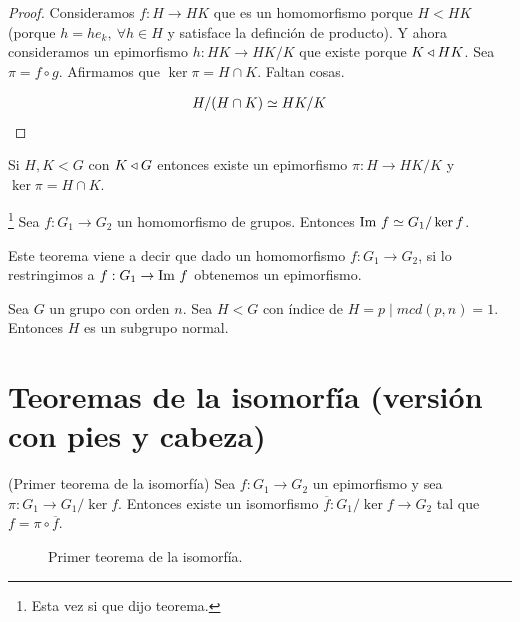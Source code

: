 


\begin{proof}
	Consideramos $f:H \to HK$ que es un homomorfismo porque $H < HK$ (porque $h = he_k,\ \forall h \in H$ y satisface la definción de producto). Y ahora consideramos un epimorfismo $h:HK \to HK/K$ que existe porque $K \mathbin{\triangleleft} HK$. Sea $\pi = f \circ g$. Afirmamos que $\ker \pi = H \cap K$. Faltan cosas.
	
	\begin{align*}
		H/(H\cap K) \simeq HK/K
	\end{align*}
\end{proof}

\begin{cor}
	Si $H,K < G$ con $K \mathbin{\triangleleft} G$ entonces existe un epimorfismo $\pi:H\to HK/K$ y $\ker \pi = H \cap K$.
\end{cor}

\begin{thm}\footnote{Esta vez si que dijo teorema.}
	Sea $f:G_1 \to G_2$ un homomorfismo de grupos. Entonces $\text{Im } f \simeq G_1 / \ker f$.
\end{thm}

Este teorema viene a decir que dado un homomorfismo $f:G_1 \to G_2$, si lo restringimos a $f:G_1 \to \text{Im } f$ obtenemos un epimorfismo.


\begin{pro}
	Sea $G$ un grupo con orden $n$. Sea $H < G$ con índice de $H = p \mid mcd(p,n) = 1$. Entonces $H$ es un subgrupo normal.
\end{pro}

\section{Teoremas de la isomorfía (versión con pies y cabeza)}

\begin{thm}(Primer teorema de la isomorfía)
	Sea $f:G_1 \to G_2$ un epimorfismo y sea $\pi:G_1 \to G_1/\ker f$. Entonces existe un isomorfismo $\overline{f} : G_1 / \ker f \to G_2$ tal que $f = \pi \circ \overline{f}$.
\end{thm}

\begin{figure}[h]
	\centering
	\caption{Primer teorema de la isomorfía.}
	\label{fig:tmisomorfia1}
\end{figure}

